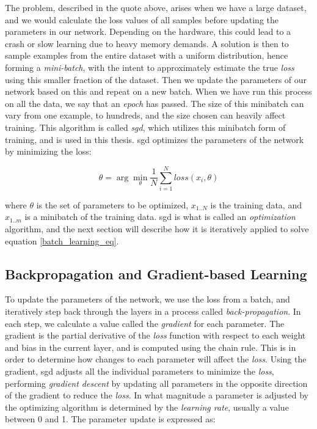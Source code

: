     The problem, described in the quote above, arises when we have a large dataset, and we would calculate the loss values of all samples before updating the parameters in our network\cite{Goodfellow-et-al-2016_SGD}. Depending on the hardware, this could lead to a crash or slow learning due to heavy memory demands. A solution is then to sample examples from the entire dataset with a uniform distribution, hence forming a \textit{mini-batch}, with the intent to approximately estimate the true \textit{loss} using this smaller fraction of the dataset. Then we update the parameters of our network based on this and repeat on a new batch. When we have run this process on all the data, we say that an \textit{epoch} has passed. The size of this minibatch can vary from one example, to hundreds, and the size chosen can heavily affect training\cite{wilson2001need_learning_rate}. This algorithm is called \textit{\gls{sgd}}\cite{Goodfellow-et-al-2016_SGD}, which utilizes this minibatch form of training, and is used in this thesis. \gls{sgd} optimizes the parameters of the network by minimizing the loss\cite{pmlr-v37-ioffe15_batch_norm}:
    
        \begin{equation} \label{batch_learning_eq}
            \theta = \arg \min_{\theta}\dfrac{1}{N} \sum^{N}_{i=1} loss (x_{i},\theta)
        \end{equation}
    
    where $\theta$ is the set of parameters to be optimized, $x_{1..N}$ is the training data, and $x_{1..m}$ is a minibatch of the training data. \gls{sgd} is what is called an \textit{optimization} algorithm, and the next section will describe how it is iteratively applied to solve equation \ref{batch_learning_eq}. 
    
    
\subsection{Backpropagation and Gradient-based Learning}
    To update the parameters of the network, we use the loss from a batch, and iteratively step back through the layers in a process called \textit{back-propagation}\cite{rumelhart1986learning_backprop}. In each step, we calculate a value called the \textit{gradient} for each parameter. The gradient is the partial derivative of the \textit{loss} function with respect to each weight and bias in the current layer, and is computed using the chain rule. This is in order to determine how changes to each parameter will affect the \textit{loss}. Using the gradient, \gls{sgd} adjusts all the individual parameters to minimize the \textit{loss}, performing \textit{gradient descent}\cite{Goodfellow-et-al-2016_gradient_descent} by updating all parameters in the opposite direction of the gradient to reduce the \textit{loss}. In what magnitude a parameter is adjusted by the optimizing algorithm is determined by the \textit{learning rate}, usually a value between 0 and 1. The parameter update is expressed as\cite{pmlr-v37-ioffe15_batch_norm}:
    
